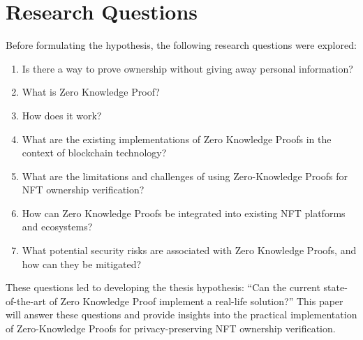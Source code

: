 \section{Research Questions}
Before formulating the hypothesis, the following research questions were explored:

\begin{enumerate}
\item Is there a way to prove ownership without giving away personal information?
\item What is Zero Knowledge Proof?
\item How does it work?
\item What are the existing implementations of Zero Knowledge Proofs in the context of blockchain technology?
\item What are the limitations and challenges of using Zero-Knowledge Proofs for NFT ownership verification?
\item How can Zero Knowledge Proofs be integrated into existing NFT platforms and ecosystems?
\item What potential security risks are associated with Zero Knowledge Proofs, and how can they be mitigated?
\end{enumerate}

These questions led to developing the thesis hypothesis: ``Can the current state-of-the-art of Zero Knowledge Proof implement a real-life solution?'' This paper will answer these questions and provide insights into the practical implementation of Zero-Knowledge Proofs for privacy-preserving NFT ownership verification.